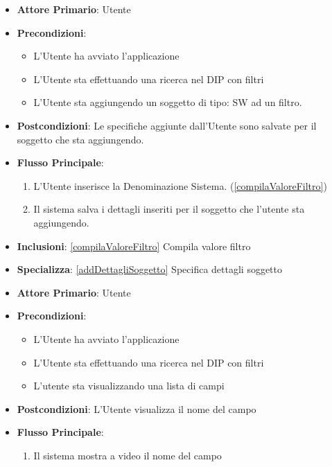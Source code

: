 \begin{itemize}
      \item \textbf{Attore Primario}: Utente
      \item \textbf{Precondizioni}: \begin{itemize}
            \item L'Utente ha avviato l'applicazione
            \item L'Utente sta effettuando una ricerca nel DIP con filtri
            \item L'Utente sta aggiungendo un soggetto di tipo: SW ad un filtro.
      \end{itemize}
      \item \textbf{Postcondizioni}:  Le specifiche aggiunte dall'Utente sono salvate per il soggetto che sta aggiungendo.
      \item \textbf{Flusso Principale}:
            \begin{enumerate}
                  \item L'Utente inserisce la Denominazione Sistema. (\ref{compilaValoreFiltro})
                  \item Il sistema salva i dettagli inseriti per il soggetto che l'utente sta aggiungendo.
            \end{enumerate}
      \item \textbf{Inclusioni}: \ref{compilaValoreFiltro} Compila valore filtro
      \item \textbf{Specializza}: \ref{addDettagliSoggetto} Specifica dettagli soggetto
\end{itemize}

\begin{itemize}
      \item \textbf{Attore Primario}: Utente
      \item \textbf{Precondizioni}: 
      \begin{itemize}
            \item L'Utente ha avviato l'applicazione
            \item L'Utente sta effettuando una ricerca nel DIP con filtri
            \item L'utente sta visualizzando una lista di campi
      \end{itemize}
      \item \textbf{Postcondizioni}:  L'Utente visualizza il nome del campo
      \item \textbf{Flusso Principale}:
      \begin{enumerate}
            \item Il sistema mostra a video il nome del campo
      \end{enumerate}
\end{itemize}

